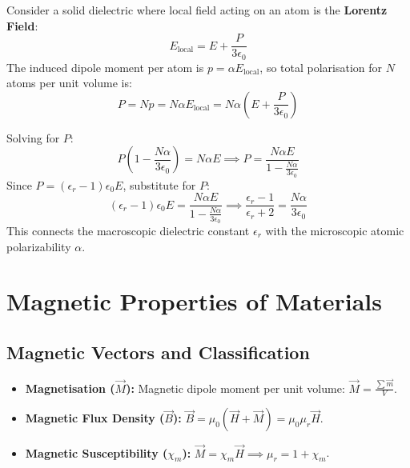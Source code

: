 \documentclass[12pt,a4paper]{article}
\begin{document}
Consider a solid dielectric where local field acting on an atom is the \textbf{Lorentz Field}:
\begin{equation}
E_{\text{local}} = E + \frac{P}{3\epsilon_0}
\end{equation}
The induced dipole moment per atom is $p = \alpha E_{\text{local}}$, so total polarisation for $N$ atoms per unit volume is:
\begin{equation}
P = N p = N \alpha E_{\text{local}} = N \alpha \left( E + \frac{P}{3\epsilon_0} \right)
\end{equation}

\begin{tcolorbox}[formulabox, title={\textbf{Clausius-Mossotti Relation Derivation}}]
Solving for $P$:
\begin{equation}
P \left( 1 - \frac{N \alpha}{3\epsilon_0} \right) = N \alpha E \implies P = \frac{N \alpha E}{1 - \frac{N \alpha}{3\epsilon_0}}
\end{equation}
Since $P = (\epsilon_r - 1)\epsilon_0 E$, substitute for $P$:
\begin{equation}
(\epsilon_r - 1)\epsilon_0 E = \frac{N \alpha E}{1 - \frac{N \alpha}{3\epsilon_0}} \implies \frac{\epsilon_r - 1}{\epsilon_r + 2} = \frac{N \alpha}{3 \epsilon_0}
\end{equation}
This connects the macroscopic dielectric constant $\epsilon_r$ with the microscopic atomic polarizability $\alpha$.
\end{tcolorbox}

\section{Magnetic Properties of Materials}

\subsection{Magnetic Vectors and Classification}

\begin{tcolorbox}[formulabox, title={\textbf{Magnetic Field Relations}}]
\begin{itemize}[leftmargin=*, itemsep=3pt]
  \item \textbf{Magnetisation ($\vec{M}$):} Magnetic dipole moment per unit volume: $\vec{M} = \frac{\sum \vec{m}}{V}$.
  \item \textbf{Magnetic Flux Density ($\vec{B}$):} $\vec{B} = \mu_0 (\vec{H} + \vec{M}) = \mu_0 \mu_r \vec{H}$.
  \item \textbf{Magnetic Susceptibility ($\chi_m$):} $\vec{M} = \chi_m \vec{H} \implies \mu_r = 1 + \chi_m$.
\end{itemize}
\end{tcolorbox}
\end{document}

